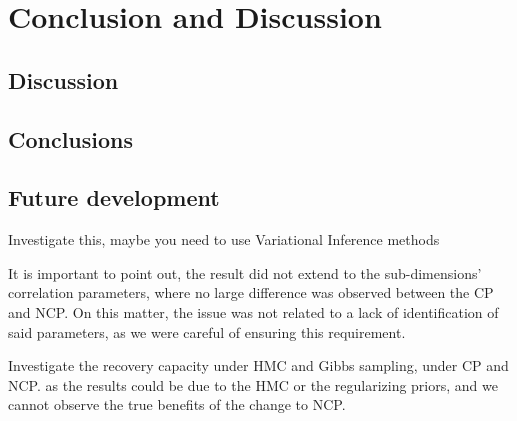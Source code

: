\chapter{Conclusion and Discussion} \label{cap:conclusions}

\section{Discussion}

\section{Conclusions}

\section{Future development}

Investigate this, maybe you need to use Variational Inference methods

It is important to point out, the result did not extend to the sub-dimensions' correlation parameters, where no large difference was observed between the CP and NCP. On this matter, the issue was not related to a lack of identification of said parameters, as we were careful of ensuring this requirement.


Investigate the recovery capacity under HMC and Gibbs sampling, under CP and NCP. as the results could be due to the HMC or the regularizing priors, and we cannot observe the true benefits of the change to NCP.